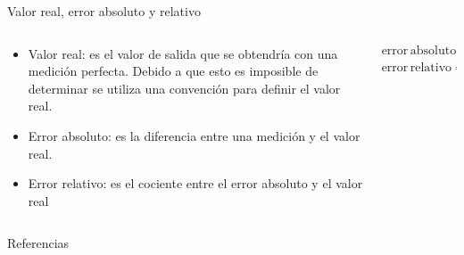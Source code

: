 \documentclass[aspectratio=169]{beamer}
\begin{document}
\begin{frame}{Valor real, error absoluto y relativo}
    \begin{columns}[c, onlytextwidth]
        \begin{column}{0.55\textwidth}
            \begin{itemize}
                \item Valor real: es el valor de salida que se obtendría con una medición perfecta. Debido a que esto es imposible de determinar se utiliza una convención para definir el valor real.  
                \item Error absoluto: es la diferencia entre una medición y el valor real. 
                \item Error relativo: es el cociente entre el error absoluto y el valor real
            \end{itemize}
        \end{column}
        \begin{column}{0.40\textwidth}
            \begin{equation*}
                \mathrm{error\,absoluto} = \mathrm{medición} - \mathrm{valor\,real}
            \end{equation*}
            \begin{equation*}
                \mathrm{error\,relativo} = \dfrac{\mathrm{error\,absoluto}}{\mathrm{valor\,real}}
            \end{equation*}
        \end{column}
    \end{columns}
\end{frame}

\begin{frame}{Referencias}

\footnotesize

\end{frame}
\end{document}
